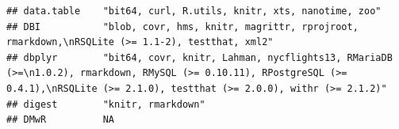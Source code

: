 \documentclass[]{article}
\begin{document}
\begin{verbatim}
## data.table    "bit64, curl, R.utils, knitr, xts, nanotime, zoo"                                                                                                                                                                                                                                                                                                                                                                                                                                                                                                                                         
## DBI           "blob, covr, hms, knitr, magrittr, rprojroot, rmarkdown,\nRSQLite (>= 1.1-2), testthat, xml2"                                                                                                                                                                                                                                                                                                                                                                                                                                                                                             
## dbplyr        "bit64, covr, knitr, Lahman, nycflights13, RMariaDB (>=\n1.0.2), rmarkdown, RMySQL (>= 0.10.11), RPostgreSQL (>= 0.4.1),\nRSQLite (>= 2.1.0), testthat (>= 2.0.0), withr (>= 2.1.2)"                                                                                                                                                                                                                                                                                                                                                                                                      
## digest        "knitr, rmarkdown"                                                                                                                                                                                                                                                                                                                                                                                                                                                                                                                                                                        
## DMwR          NA                                                                                                                                                                                                                                                                                                                                                                                                                                                                                                                                                                                        

\end{verbatim}
\end{document}
